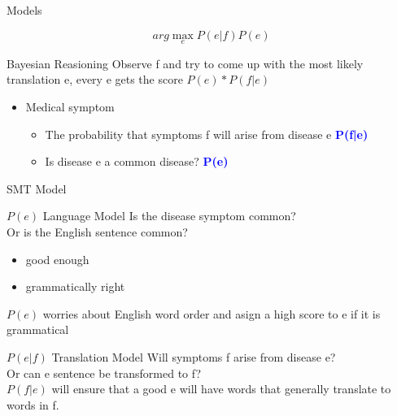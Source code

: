 \documentclass{beamer}
\begin{document}
\begin{frame}{Models}
    \begin{displaybox}{5cm}     %
    \[ 
        arg\max_{e}{P(e|f)P(e)}
     \] 
     \end{displaybox} 
    \pause
    \begin{block}{Bayesian Reasioning}
        Observe f and try to come up with the most likely translation e, every e gets the score $P(e)*P(f|e)$
        \begin{itemize}
            \item Medical symptom
                \pause
                \begin{itemize}
                    \item The probability that symptoms f will arise from disease e \textcolor{blue}{\textbf{P(f|e)}}
                \pause
                    \item Is disease e a common disease? \textcolor{blue}{\textbf{P(e)}}
                \end{itemize}
        \end{itemize}
    \end{block}
\end{frame}

\begin{frame}{SMT Model}
    \begin{block}{$P(e)$ Language Model}
        Is the disease symptom common?\\
        Or is the English sentence common?
        \begin{itemize}
            \item good enough
            \item grammatically right
        \end{itemize}
        \pause
        $P(e)$ worries about English word order and asign a high score to e if it is grammatical
    \end{block}

    \begin{block}{$P(e|f)$ Translation Model}
        Will symptoms f arise from disease e?\\
        Or can e sentence be transformed to f?\\
        \pause
        $P(f|e)$ will ensure that a good e will have words that generally translate to words in f.
    \end{block}
\end{frame}
\end{document}
